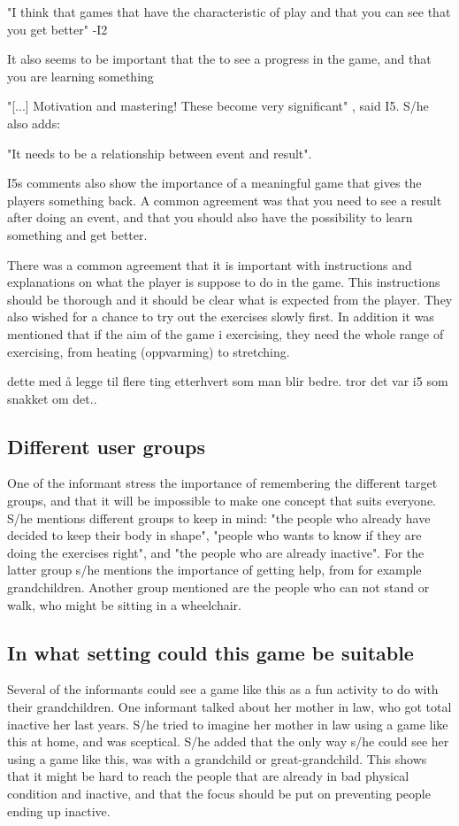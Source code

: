 "I think that games that have the characteristic of play and that you can see that you get better" -I2

It also seems to be important that the to see a progress in the game, and that you are learning something 

"[...] Motivation and mastering! These become very significant" , said I5. S/he also adds:

"It needs to be a relationship between event and result".

I5s comments also show the importance of a meaningful game that gives the players something back. A common agreement was that you need to see a result after doing an event, and that you should also have the possibility to learn something and get better. 

There was a common agreement that it is important with instructions and explanations on what the player is suppose to do in the game. This instructions should be thorough and it should be clear what is expected from the player. They also wished for a chance to try out the exercises slowly first. In addition it was mentioned that if the aim of the game i exercising, they need the whole range of exercising, from heating (oppvarming) to stretching. 

dette med å legge til flere ting etterhvert som man blir bedre. tror det var i5 som snakket om det..

\subsection{Different user groups}
One of the informant stress the importance of remembering the different target groups, and that it will be impossible to make one concept that suits everyone. S/he mentions different groups to keep in mind: "the people who already have decided to keep their body in shape", "people who wants to know if they are doing the exercises right", and "the people who are already inactive". For the latter group s/he mentions the importance of getting help, from for example grandchildren.  Another group mentioned are the people who can not stand or walk, who might be sitting in a wheelchair. 

\subsection{In what setting could this game be suitable}
Several of the informants could see a game like this as a fun activity to do with their grandchildren. One informant talked about her mother in law, who got total inactive her last years. S/he tried to imagine her mother in law using a game like this at home, and was sceptical. S/he added that the only way s/he could see her using a game like this, was with a grandchild or great-grandchild. This shows that it might be hard to reach the people that are already in bad physical condition and inactive, and that the focus should be put on preventing people ending up inactive. 

